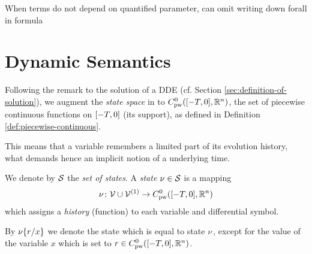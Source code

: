     When terms do not depend on quantified parameter, can omit writing down forall in formula

\section{Dynamic Semantics}
    \label{sec:dynamic-semantics}

    Following the remark to the solution of a DDE (cf. Section \ref{sec:definition-of-solution}), we augment the \emph{state space} in \dL to $\statespace$, the set of piecewise continuous functions on $\delayinterval$ (its support), as defined in Definition \ref{def:piecewise-continuous}.

    This means that a variable remembers a limited part of its evolution history, what demands hence an implicit notion of a underlying time.

    We denote by $\states$ the \emph{set of states}. A \emph{state} $\asstate\in\states$ is a mapping
    \begin{equation}
        \asstate \from \allvars\cup\diffvars \to \statespace
    \end{equation}
    which assigns a \emph{history} (function) to each variable and differential symbol.

    By $\modif{\asstate}{x}{r}$ we denote the state which is equal to state $\asstate$, except for the value of the variable $x$ which is set to $r\in\statespace$.




